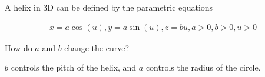 A helix in 3D can be defined by the parametric equations

\begin{align*}
    x = a \cos{(u)}, y = a \sin{(u)}, z = bu, a > 0, b > 0, u > 0
\end{align*}

How do $a$ and $b$ change the curve?

\begin{solution}
    $b$ controls the pitch of the helix, and $a$ controls the radius of the circle.
\end{solution}